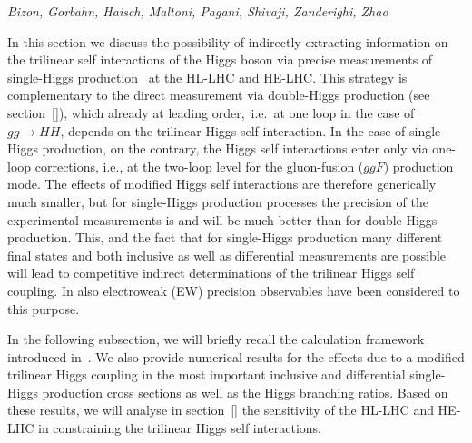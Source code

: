 \newcommand{\tth}{t\bar{t}H}
\newcommand{\tril}{\lambda_{3}}
\newcommand{\trilsm}{\tril^{\rm SM}}
\newcommand{\ktre}{\kappa_{3}}
\newcommand{\dsigmah}{\delta \sigma_{\tril}}
\newcommand{\dBR}{\delta {\rm BR}_{\tril}}
\newcommand{\ggF}{gg{\rm F}}
\newcommand{\br}{{\rm BR}}
\newcommand{\muif}{\mu_i^f}
\newcommand{\pnote}[1]{\textbf{[P:} \textit{\color{red} #1}\textbf{]}}

\begin{center}
\textit{Bizon, Gorbahn, Haisch, Maltoni, Pagani, Shivaji, Zanderighi, Zhao}
\end{center}

In this section we discuss the possibility of indirectly extracting information on the trilinear self interactions of the Higgs boson via precise measurements of single-Higgs production~\cite{McCullough:2013rea,Gorbahn:2016uoy,Degrassi:2016wml,Bizon:2016wgr,DiVita:2017eyz,Barklow:2017awn,Maltoni:2017ims,DiVita:2017vrr,Maltoni:2018ttu} at the HL-LHC and HE-LHC. This strategy is complementary to the direct measurement via double-Higgs production (see section~\ref{}), which already at leading order,~i.e.~at one loop in the case of $gg \to HH$, depends on the trilinear Higgs self interaction. In the case of single-Higgs production, on the contrary, the Higgs self interactions enter only via one-loop corrections, i.e., at the two-loop level for the gluon-fusion ($ggF$) production mode. The effects of modified Higgs self interactions are therefore generically much smaller, but for single-Higgs production processes the precision of the experimental measurements is and will be much better than for double-Higgs production. This, and the fact that for single-Higgs production many different final states and both inclusive as well as  differential measurements are possible will lead to competitive indirect determinations of the trilinear Higgs self coupling. In \cite{Degrassi:2017ucl,Kribs:2017znd} also electroweak (EW) precision observables have been considered to this purpose.

In the following subsection, we will briefly recall the calculation framework introduced in~\cite{Gorbahn:2016uoy,Degrassi:2016wml}. We also provide  numerical results for the effects due to a modified  trilinear Higgs coupling in the most important inclusive and differential single-Higgs production cross sections as well as the Higgs branching ratios. Based on these results, we will analyse in section~\ref{} the sensitivity of the HL-LHC and HE-LHC in constraining the trilinear Higgs self interactions. 

